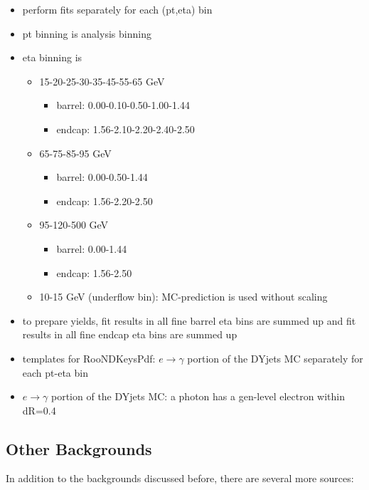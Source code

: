 \begin{itemize}
  \item perform fits separately for each (pt,eta) bin
  \item pt binning is analysis binning
  \item eta binning is 
     \begin{itemize}
        \item 15-20-25-30-35-45-55-65 GeV
           \begin{itemize}
              \item barrel: 0.00-0.10-0.50-1.00-1.44
              \item endcap: 1.56-2.10-2.20-2.40-2.50
           \end{itemize}
        \item 65-75-85-95 GeV
          \begin{itemize}
              \item barrel: 0.00-0.50-1.44
              \item endcap: 1.56-2.20-2.50
           \end{itemize}
        \item 95-120-500 GeV
          \begin{itemize}
              \item barrel: 0.00-1.44
              \item endcap: 1.56-2.50
           \end{itemize}
        \item 10-15 GeV (underflow bin): MC-prediction is used without scaling
     \end{itemize}
  \item to prepare yields, fit results in all fine barrel eta bins are summed up and fit results in all fine endcap eta bins are summed up
  \item templates for RooNDKeysPdf: $e\rightarrow\gamma$ portion of the DYjets MC separately for each pt-eta bin
  \item $e\rightarrow\gamma$ portion of the DYjets MC: a photon has a gen-level electron within dR=0.4 
\end{itemize}






\subsection{Other Backgrounds}

In addition to the backgrounds discussed before, there are several more sources:

